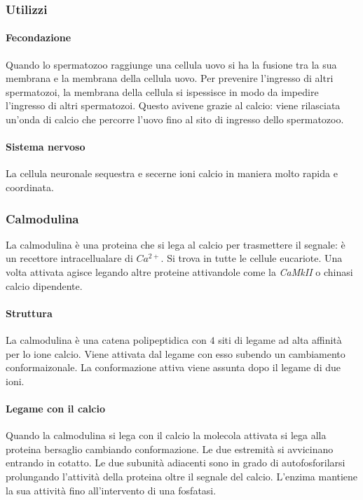 		\subsubsection{Utilizzi}

			\paragraph{Fecondazione}
			Quando lo spermatozoo raggiunge una cellula uovo si ha la fusione tra la sua membrana e la membrana della cellula uovo.
			Per prevenire l'ingresso di altri spermatozoi, la membrana della cellula si ispessisce in modo da impedire l'ingresso di altri spermatozoi.
			Questo avivene grazie al calcio: viene rilasciata un'onda di calcio che percorre l'uovo fino al sito di ingresso dello spermatozoo.

			\paragraph{Sistema nervoso}
			La cellula neuronale sequestra e secerne ioni calcio in maniera molto rapida e coordinata.

		\subsubsection{Calmodulina}
		La calmodulina \`e una proteina che si lega al calcio per trasmettere il segnale: \`e un recettore intracellualare di \emph{$Ca^{2+}$}.
		Si trova in tutte le cellule eucariote.
		Una volta attivata agisce legando altre proteine attivandole come la \emph{CaMkII} o chinasi calcio dipendente.

			\paragraph{Struttura}
			La calmodulina \`e una catena polipeptidica con $4$ siti di legame ad alta affinit\`a per lo ione calcio.
			Viene attivata dal legame con esso subendo un cambiamento conformaizonale.
			La conformazione attiva viene assunta dopo il legame di due ioni.

			\paragraph{Legame con il calcio}
			Quando la calmodulina si lega con il calcio la molecola attivata si lega alla proteina bersaglio cambiando conformazione.
			Le due estremit\`a si avvicinano entrando in cotatto.
			Le due subunit\`a adiacenti sono in grado di autofosforilarsi prolungando l'attivit\`a della proteina oltre il segnale del calcio.
			L'enzima mantiene la sua attivit\`a fino all'intervento di una fosfatasi.

